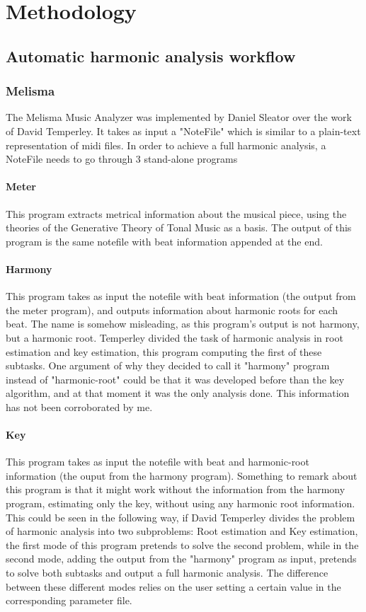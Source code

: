 \normallinespacing

\chapter{Methodology}
\label{chap:methodology}

\section{Automatic harmonic analysis workflow}
  \subsection{Melisma}
  The Melisma Music Analyzer was implemented by Daniel Sleator over the work of David Temperley. It takes as input a "NoteFile" which is similar to a plain-text representation of midi files.
  In order to achieve a full harmonic analysis, a NoteFile needs to go through 3 stand-alone programs
  	\subsubsection{Meter}
    This program extracts metrical information about the musical piece, using the theories of the Generative Theory of Tonal Music as a basis.
    The output of this program is the same notefile with beat information appended at the end.
    \subsubsection{Harmony}
    This program takes as input the notefile with beat information (the output from the meter program), and outputs information about harmonic roots for each beat. The name is somehow misleading, as this program's output is not harmony, but a harmonic root. Temperley divided the task of harmonic analysis in root estimation and key estimation, this program computing the first of these subtasks. One argument of why they decided to call it "harmony" program instead of "harmonic-root" could be that it was developed before than the key algorithm, and at that moment it was the only analysis done. This information has not been corroborated by me.
    \subsubsection{Key}
    This program takes as input the notefile with beat and harmonic-root information (the ouput from the harmony program). Something to remark about this program is that it might work without the information from the harmony program, estimating only the key, without using any harmonic root information. This could be seen in the following way, if David Temperley divides the problem of harmonic analysis into two subproblems: Root estimation and Key estimation, the first mode of this program pretends to solve the second problem, while in the second mode, adding the output from the "harmony" program as input, pretends to solve both subtasks and output a full harmonic analysis. The difference between these different modes relies on the user setting a certain value in the corresponding parameter file.
